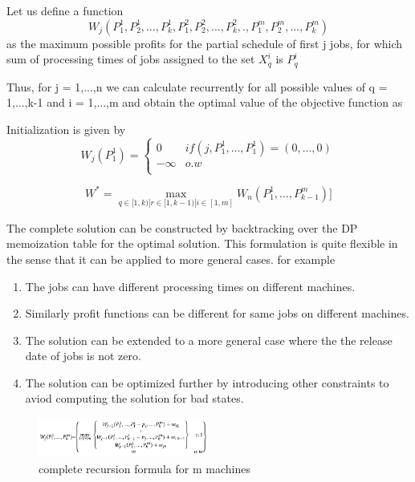 \documentclass[11pt, a4paper, notitlepage, oneside]{article}
\begin{document}
{Let us define a function
$$
    W_j(P_1^1, P_2^1, ... , P_k^1, P_1^2, P_2^2, ... , P_k^2, .  , P_1^m, P_2^m, ... , P_k^m)
$$ 
as the maximum possible profits for the partial schedule of first j jobs, for which sum of processing times of jobs assigned to the set $X_q^i$ is $P_q^i$

Thus, for j = 1,...,n we can calculate recurrently for all possible values of q = 1,...,k-1 and i = 1,...,m and obtain the optimal value of the objective function as

Initialization is given by
$$
    W_j(P_1^1)= 
            \begin{cases} 
              0 & if (j,P_1^1,...,P_1^1)=(0,...,0) \\
              -\infty & o.w \\
            \end{cases}
$$


$$
    W^* = \max_{q \in [1,k) |
    r \in [1,k-1) |
    i \in [1,m] } {W_n(P_1^1,...,P_{k-1}^m) ]}
$$



The complete solution can be constructed by backtracking over the DP memoization table for the optimal solution. This formulation is quite flexible in the sense that it can be applied to more general cases. for example

\begin{enumerate}
    \item The jobs can have different processing times on different machines.
    \item Similarly profit functions can be different for same jobs on different machines.
    \item The solution can be extended to a more general case where the the release date of jobs is not zero.
    \item The solution can be optimized further by introducing other constraints to aviod computing the solution for bad states.
\end{enumerate}





\begin{figure}[!h]
\caption{complete recursion formula for m machines }
\centering
\includegraphics[width=0.5\textwidth]{last}
\end{figure}

















}
\end{document}
